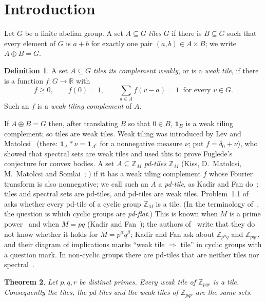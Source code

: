 \documentclass[11pt,a4paper]{amsart}
\newtheorem{theorem}{Theorem}
\theoremstyle{definition}
\newtheorem{definition}[theorem]{Definition}
\theoremstyle{remark}
\newcommand{\Z}{\mathbb{Z}}
\newcommand{\R}{\mathbb{R}}
\newcommand{\one}{\mathbf{1}}
\begin{document}
\section{Introduction}

Let $G$ be a finite abelian group. A set $A\subseteq G$ \emph{tiles} $G$ if there is $B\subseteq G$ such that
every element of $G$ is $a+b$ for exactly one pair $(a,b)\in A\times B$; we write $A\oplus B=G$.

\begin{definition}
A set $A\subseteq G$ \emph{tiles its complement weakly}, or is a \emph{weak tile}, if there is a function
$f\colon G\to\R$ with
\[
 f\ge 0,\qquad f(0)=1,\qquad \sum_{a\in A} f(v-a)=1\ \text{ for every } v\in G .
\]
Such an $f$ is a \emph{weak tiling complement} of $A$.
\end{definition}

If $A\oplus B=G$ then, after translating $B$ so that $0\in B$, $\one_B$ is a weak tiling complement; so tiles are
weak tiles. Weak tiling was
introduced by Lev and Matolcsi~\cite{LM} (there: $\one_A*\nu=\one_{A^c}$ for a nonnegative measure $\nu$; put
$f=\delta_0+\nu$), who showed that spectral sets are weak tiles and used this to prove Fuglede's conjecture for
convex bodies. A set $A\subseteq\Z_M$ \emph{pd-tiles} $\Z_M$ (Kiss, D.~Matolcsi, M.~Matolcsi and
Somlai~\cite[Definition~1.1]{KMMS}; \cite[Definition~1.3]{KLMS}) if it has a weak tiling complement $f$ whose Fourier transform is also
nonnegative; we call such an $A$ a \emph{pd-tile}, as Kadir and Fan do~\cite[Definition~1.2]{KF}; tiles and spectral sets are pd-tiles, and pd-tiles are weak tiles. Problem~1.1 of \cite{KLMS} asks
whether every pd-tile of a cyclic group $\Z_M$ is a tile.
(In the terminology of~\cite{KMMS}, the question is which cyclic groups are \emph{pd-flat}.) This is known when
$M$ is a prime power~\cite{KLMS} and when $M=pq$ (Kadir and Fan~\cite{KF}); the authors of~\cite{KLMS} write that
they do not know whether it holds for $M=p^\alpha q^\beta$; Kadir and Fan ask about $\Z_{p^nq}$ and $\Z_{pqr}$,
and their diagram of implications marks ``weak tile $\Rightarrow$ tile'' in cyclic groups with a question mark. In non-cyclic groups there are pd-tiles that are neither tiles nor
spectral~\cite{KLMS2}.

\begin{theorem}\label{thm:main}
Let $p,q,r$ be distinct primes. Every weak tile of $\Z_{pqr}$ is a tile. Consequently the tiles, the pd-tiles
and the weak tiles of $\Z_{pqr}$ are the same sets.
\end{theorem}
\end{document}
